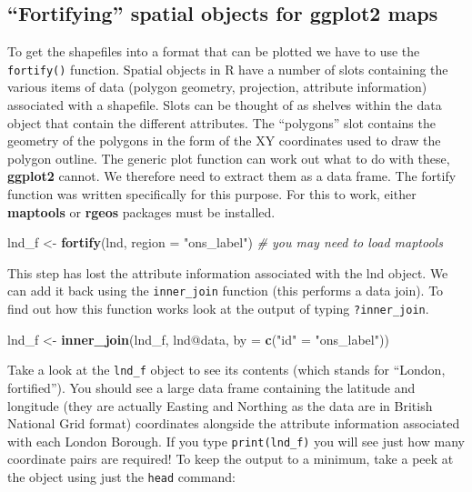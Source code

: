 \documentclass[]{article}
\newenvironment{Shaded}{}{}
\newcommand{\KeywordTok}[1]{\textcolor[rgb]{0.00,0.44,0.13}{\textbf{{#1}}}}
\newcommand{\DataTypeTok}[1]{\textcolor[rgb]{0.56,0.13,0.00}{{#1}}}
\newcommand{\StringTok}[1]{\textcolor[rgb]{0.25,0.44,0.63}{{#1}}}
\newcommand{\CommentTok}[1]{\textcolor[rgb]{0.38,0.63,0.69}{\textit{{#1}}}}
\newcommand{\NormalTok}[1]{{#1}}
\begin{document}
\subsection{``Fortifying'' spatial objects for ggplot2
maps}\label{fortifying-spatial-objects-for-ggplot2-maps}

To get the shapefiles into a format that can be plotted we have to use
the \texttt{fortify()} function. Spatial objects in R have a number of
slots containing the various items of data (polygon geometry,
projection, attribute information) associated with a shapefile. Slots
can be thought of as shelves within the data object that contain the
different attributes. The ``polygons'' slot contains the geometry of the
polygons in the form of the XY coordinates used to draw the polygon
outline. The generic plot function can work out what to do with these,
\textbf{ggplot2} cannot. We therefore need to extract them as a data
frame. The fortify function was written specifically for this purpose.
For this to work, either \textbf{maptools} or \textbf{rgeos} packages
must be installed.

\begin{Shaded}
\begin{Highlighting}[]
\NormalTok{lnd_f <-}\StringTok{ }\KeywordTok{fortify}\NormalTok{(lnd, }\DataTypeTok{region =} \StringTok{"ons_label"}\NormalTok{) }\CommentTok{# you may need to load maptools}
\end{Highlighting}
\end{Shaded}

This step has lost the attribute information associated with the lnd
object. We can add it back using the \texttt{inner\_join} function (this
performs a data join). To find out how this function works look at the
output of typing \texttt{?inner\_join}.

\begin{Shaded}
\begin{Highlighting}[]
\NormalTok{lnd_f <-}\StringTok{ }\KeywordTok{inner_join}\NormalTok{(lnd_f, lnd@data, }\DataTypeTok{by =} \KeywordTok{c}\NormalTok{(}\StringTok{"id"} \NormalTok{=}\StringTok{ "ons_label"}\NormalTok{))}
\end{Highlighting}
\end{Shaded}

Take a look at the \texttt{lnd\_f} object to see its contents (which
stands for ``London, fortified''). You should see a large data frame
containing the latitude and longitude (they are actually Easting and
Northing as the data are in British National Grid format) coordinates
alongside the attribute information associated with each London Borough.
If you type \texttt{print(lnd\_f)} you will see just how many coordinate
pairs are required! To keep the output to a minimum, take a peek at the
object using just the \texttt{head} command:
\end{document}
